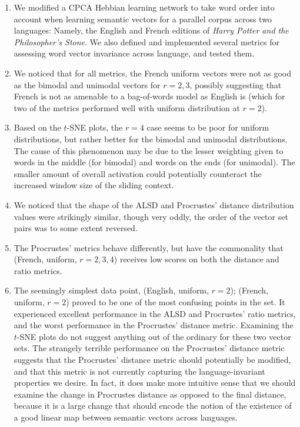 \documentclass[12pt, usenames]{article}
\theoremstyle{definition}
\theoremstyle{definition}
\theoremstyle{definition}
\begin{document}
\begin{enumerate}

\item We modified a CPCA Hebbian learning network to take word order into account when learning semantic vectors for a parallel corpus across two languages: Namely, the English and French editions of \textit{Harry Potter and the Philosopher's Stone}. We also defined and implemented several metrics for assessing word vector invariance across language, and tested them.

\item We noticed that for all metrics, the French uniform vectors were not as good as the bimodal and unimodal vectors for $r = 2, 3$, possibly suggesting that French is not as amenable to a bag-of-words model as English is (which for two of the metrics performed well with uniform distribution at $r = 2$). 

\item Based on the $t$-SNE plots, the $r = 4$ case seems to be poor for uniform distributions, but rather better for the bimodal and unimodal distributions. The cause of this phenomenon may be due to the lesser weighting given to words in the middle (for bimodal) and words on the ends (for unimodal). The smaller amount of overall activation could potentially counteract the increased window size of the sliding context.

\item We noticed that the shape of the ALSD and Procrustes' distance distribution values were strikingly similar, though very oddly, the order of the vector set pairs was to some extent reversed. 

\item The Procrustes' metrics behave differently, but have the commonality that (French, uniform, $r = 2, 3, 4$) receives low scores on both the distance and ratio metrics. 

\item The seemingly simplest data point, (English, uniform, $r = 2$); (French, uniform, $r = 2$) proved to be one of the most confusing points in the set. It experienced excellent performance in the ALSD and Procrustes' ratio metrics, and the worst performance in the Procrustes' distance metric. Examining the $t$-SNE plots do not suggest anything out of the ordinary for these two vector sets. The strangely terrible performance on the Procrustes' distance metric suggests that the Procrustes' distance metric should potentially be modified, and that this metric is not currently capturing the language-invariant properties we desire. In fact, it does make more intuitive sense that we should examine the change in Procrustes distance as opposed to the final distance, because it is a large change that should encode the notion of the existence of a good linear map between semantic vectors across languages. 

\end{enumerate}
\end{document}
